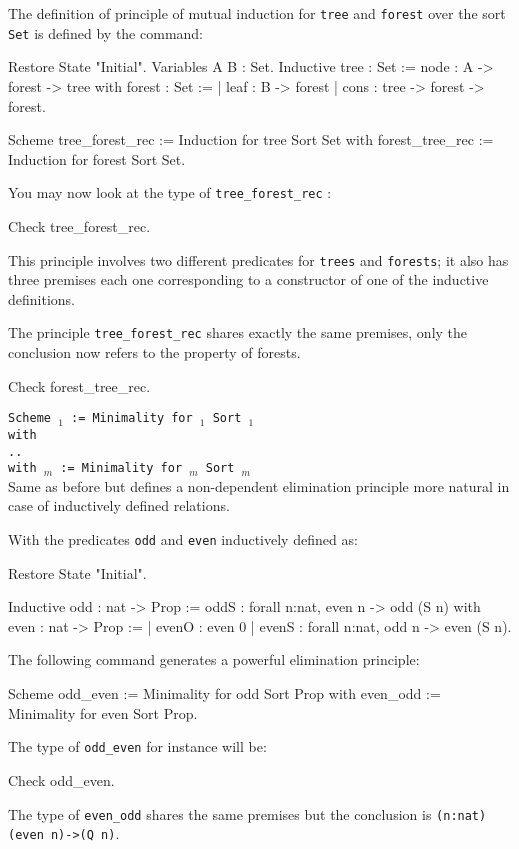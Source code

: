 \Example
The definition of principle of mutual induction for {\tt tree} and
{\tt forest} over the sort {\tt Set} is defined by the command:
\begin{coq_eval}
Restore State "Initial".
Variables A B : Set.
Inductive tree : Set :=
    node : A -> forest -> tree
with forest : Set :=
  | leaf : B -> forest
  | cons : tree -> forest -> forest.
\end{coq_eval}
\begin{coq_example*}
Scheme tree_forest_rec := Induction for tree
  Sort Set
  with forest_tree_rec := Induction for forest Sort Set.
\end{coq_example*}
You may now look at the type of {\tt tree\_forest\_rec} :
\begin{coq_example}
Check tree_forest_rec.
\end{coq_example}
This principle involves two different predicates for {\tt trees} and
{\tt forests}; it also has three premises each one corresponding to a
constructor of one of the inductive definitions.

The principle {\tt tree\_forest\_rec} shares exactly the same
premises, only the conclusion now refers to the property of forests.
\begin{coq_example}
Check forest_tree_rec.
\end{coq_example}

\begin{Variant}
\item {\tt Scheme {\ident$_1$} := Minimality for \term$_1$ Sort {\sort$_1$} \\
  with\\
  \mbox{}\hspace{0.1cm} .. \\
        with {\ident$_m$} := Minimality for {\term$_m$} Sort
        {\sort$_m$}}\\
Same as before but defines a non-dependent elimination principle more
natural in case of inductively defined relations. 
\end{Variant}

\Example
With the predicates {\tt odd} and {\tt even} inductively defined as:
\begin{coq_eval}
Restore State "Initial".
\end{coq_eval}
\begin{coq_example*}
Inductive odd : nat -> Prop :=
    oddS : forall n:nat, even n -> odd (S n)
with even : nat -> Prop :=
  | evenO : even 0%
  | evenS : forall n:nat, odd n -> even (S n).
\end{coq_example*}
The following command generates a powerful elimination
principle:
\begin{coq_example*}
Scheme odd_even := Minimality for   odd Sort Prop
  with even_odd := Minimality for even Sort Prop.
\end{coq_example*}
The type of {\tt odd\_even} for instance will be:
\begin{coq_example}
Check odd_even.
\end{coq_example}
The type of {\tt even\_odd} shares the same premises but the
conclusion is {\tt (n:nat)(even n)->(Q n)}.



%

